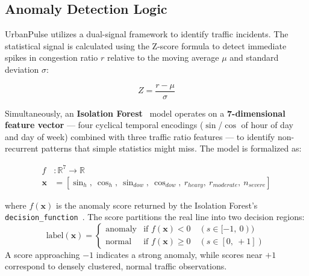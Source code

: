 \subsection{Anomaly Detection Logic}
UrbanPulse utilizes a dual-signal framework to identify traffic incidents. The statistical signal is calculated using the Z-score formula to detect immediate spikes in congestion ratio $r$ relative to the moving average $\mu$ and standard deviation $\sigma$:

\begin{equation}
    Z = \frac{r - \mu}{\sigma}
\end{equation}

Simultaneously, an \textbf{Isolation Forest}~\cite{isolation-forest} model operates on a \textbf{7-dimensional feature vector} — four cyclical temporal encodings ($\sin$/$\cos$ of hour of day and day of week) combined with three traffic ratio features — to identify non-recurrent patterns that simple statistics might miss. The model is formalized as:

\begin{align}
	f &: \mathbb{R}^7 \rightarrow \mathbb{R} \\
	\mathbf{x} &= [\sin_h,\ \cos_h,\ \sin_{dow},\ \cos_{dow},\ r_{heavy},\ r_{moderate},\ n_{severe}]
\end{align}

where $f(\mathbf{x})$ is the anomaly score returned by the Isolation Forest's \texttt{decision\_function}~\cite{isolation-forest}. The score partitions the real line into two decision regions:
\begin{equation}
	\text{label}(\mathbf{x}) =
	\begin{cases}
		\text{anomaly} & \text{if } f(\mathbf{x}) < 0 \quad (s \in [-1,\ 0)) \\
		\text{normal}  & \text{if } f(\mathbf{x}) \geq 0 \quad (s \in [0,\ +1])
	\end{cases}
\end{equation}
A score approaching $-1$ indicates a strong anomaly, while scores near $+1$ correspond to densely clustered, normal traffic observations.
